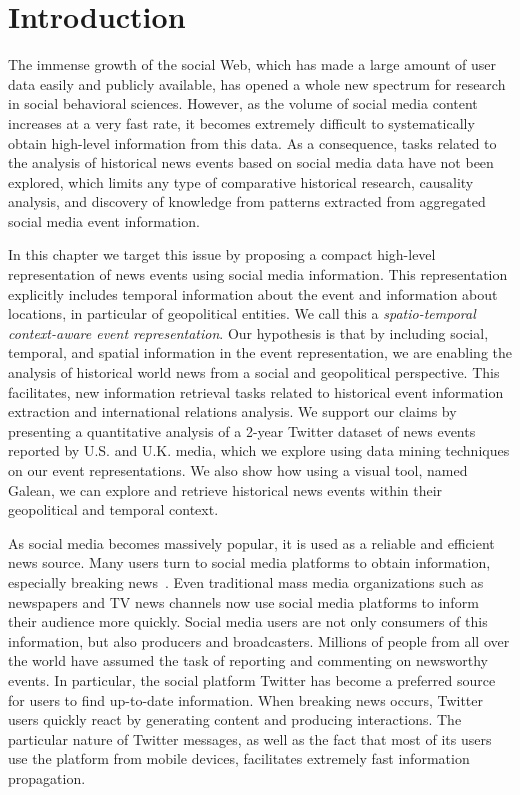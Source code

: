 
\section{Introduction}\label{sec:geo-introduction}

The immense growth of the social Web, which has made a large amount of user data
easily and publicly available, has opened a whole new spectrum for research in
social behavioral sciences.  
%
However, as the volume of social media content increases at a very fast rate, it
becomes extremely difficult to systematically obtain high-level information from
this data.  
%
As a consequence, tasks related to the analysis of historical news events based
on social media data have not been explored, which limits any type of
comparative historical research, causality analysis, and discovery of knowledge
from patterns extracted from aggregated social media event information.

In this chapter we target this issue by proposing a compact high-level
representation of news events using social media information. 
%
This representation explicitly includes temporal information about the event and
information about locations, in particular of geopolitical entities. 
%
We call this a {\em spatio-temporal context-aware event representation}. 
%
Our hypothesis is that by including social, temporal, and spatial information in
the event representation, we are enabling the analysis of historical world news
from a social and geopolitical perspective.  
%
This facilitates, new information retrieval tasks related to historical event
information extraction and international relations analysis. 
%
We support our claims by presenting a quantitative analysis of a 2-year Twitter
dataset of news events reported by U.S. and U.K.  media, which we explore using
data mining techniques on our event representations. 
%
We also show how using a visual tool, named Galean, we can explore and retrieve
historical news events within their geopolitical and temporal context.



As social media becomes massively popular, it is used as a reliable and
efficient news source.  
%
Many users turn to social media platforms to obtain information, especially
breaking news~\cite{Rogers:2013:DTT:2464464.2464511}. 
%
Even traditional mass media organizations such as newspapers and TV news
channels now use social media platforms to inform their audience more quickly.
%
Social media users are not only consumers of this information, but also
producers and broadcasters. 
%
Millions of people from all over the world have assumed the task of reporting
and commenting on newsworthy events.  
%
In particular, the social platform Twitter has become a preferred source for
users to find up-to-date information.  
%
When breaking news occurs, Twitter users quickly react by generating content and
producing interactions.  
%
The particular nature of Twitter messages, as well as the fact that most of its
users use the platform from mobile devices, facilitates extremely fast
information propagation.

